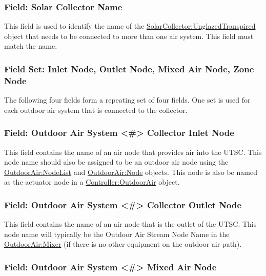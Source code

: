 \subsubsection{Field: Solar Collector Name}\label{field-solar-collector-name}

This field is used to identify the name of the \hyperref[solarcollectorunglazedtranspired]{SolarCollector:UnglazedTranspired} object that needs to be connected to more than one air system. This field must match the name.

\subsubsection{Field Set: Inlet Node, Outlet Node, Mixed Air Node, Zone Node}\label{field-set-inlet-node-outlet-node-mixed-air-node-zone-node}

The following four fields form a repeating set of four fields. One set is used for each outdoor air system that is connected to the collector.

\subsubsection{Field: Outdoor Air System \textless{}\#\textgreater{} Collector Inlet Node}\label{field-outdoor-air-system-collector-inlet-node}

This field contains the name of an air node that provides air into the UTSC. This node name should also be assigned to be an outdoor air node using the \hyperref[outdoorairnodelist]{OutdoorAir:NodeList} and \hyperref[outdoorairnode]{OutdoorAir:Node} objects. This node is also be named as the actuator node in a \hyperref[controlleroutdoorair]{Controller:OutdoorAir} object.

\subsubsection{Field: Outdoor Air System \textless{}\#\textgreater{} Collector Outlet Node}\label{field-outdoor-air-system-collector-outlet-node}

This field contains the name of an air node that is the outlet of the UTSC. This node name will typically be the Outdoor Air Stream Node Name in the \hyperref[outdoorairmixer]{OutdoorAir:Mixer} (if there is no other equipment on the outdoor air path).

\subsubsection{Field: Outdoor Air System \textless{}\#\textgreater{} Mixed Air Node}\label{field-outdoor-air-system-mixed-air-node}

